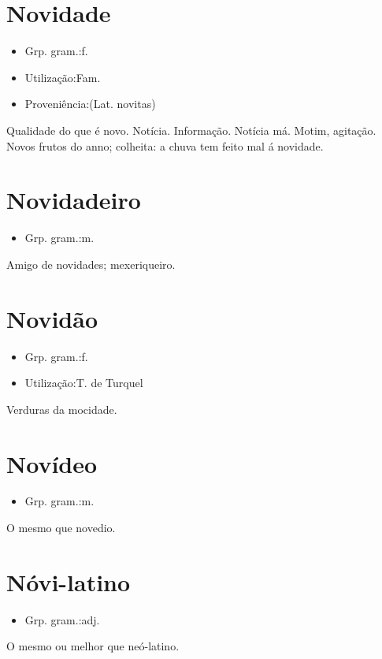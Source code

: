 \section{Novidade}
\begin{itemize}
\item {Grp. gram.:f.}
\end{itemize}
\begin{itemize}
\item {Utilização:Fam.}
\end{itemize}
\begin{itemize}
\item {Proveniência:(Lat. \textunderscore novitas\textunderscore )}
\end{itemize}
Qualidade do que é novo.
Notícia.
Informação.
Notícia má.
Motim, agitação.
Novos frutos do anno; colheita: \textunderscore a chuva tem feito mal á novidade\textunderscore .
\section{Novidadeiro}
\begin{itemize}
\item {Grp. gram.:m.}
\end{itemize}
Amigo de novidades; mexeriqueiro.
\section{Novidão}
\begin{itemize}
\item {Grp. gram.:f.}
\end{itemize}
\begin{itemize}
\item {Utilização:T. de Turquel}
\end{itemize}
Verduras da mocidade.
\section{Novídeo}
\begin{itemize}
\item {Grp. gram.:m.}
\end{itemize}
O mesmo que \textunderscore novedio\textunderscore .
\section{Nóvi-latino}
\begin{itemize}
\item {Grp. gram.:adj.}
\end{itemize}
O mesmo ou melhor que \textunderscore neó-latino\textunderscore .
